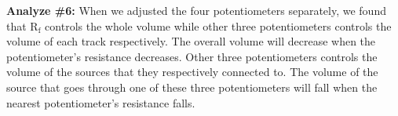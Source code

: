 \textbf{Analyze \#6:} \newline
\phantom{ } When we adjusted the four potentiometers separately, we found that $ \mathrm{R_f} $ controls the whole volume while other three potentiometers controls the volume of each track respectively. The overall volume will decrease when the potentiometer's resistance decreases. Other three potentiometers controls the volume of the sources that they respectively connected to. The volume of the source that goes through one of these three potentiometers will fall when the nearest potentiometer's resistance falls. 
